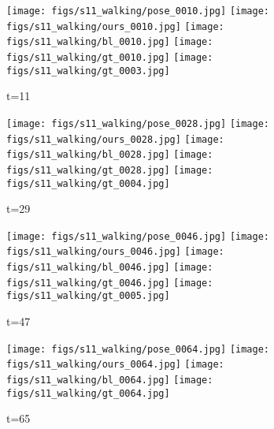 \documentclass{article}
\begin{document}
\begin{figure*}[thbp]
	\begin{subfigure}{0.04\linewidth}
        \raggedleft
    \end{subfigure}
    \begin{subfigure}{0.12\linewidth}
        \caption*{t=11}
        \vspace{-7pt}
	    \texttt{[image: figs/s11\_walking/pose\_0010.jpg]} 
  		\texttt{[image: figs/s11\_walking/ours\_0010.jpg]}
  		\texttt{[image: figs/s11\_walking/bl\_0010.jpg]}
  		\texttt{[image: figs/s11\_walking/gt\_0010.jpg]}
  		\texttt{[image: figs/s11\_walking/gt\_0003.jpg]}
	\end{subfigure} 
    \begin{subfigure}{0.12\linewidth}
        \caption*{t=29}
        \vspace{-7pt}
	    \texttt{[image: figs/s11\_walking/pose\_0028.jpg]} 
  		\texttt{[image: figs/s11\_walking/ours\_0028.jpg]}
  		\texttt{[image: figs/s11\_walking/bl\_0028.jpg]}
  		\texttt{[image: figs/s11\_walking/gt\_0028.jpg]}
  		\texttt{[image: figs/s11\_walking/gt\_0004.jpg]}
	\end{subfigure} 
    \begin{subfigure}{0.12\linewidth}
        \caption*{t=47}
        \vspace{-7pt}
	    \texttt{[image: figs/s11\_walking/pose\_0046.jpg]} 
  		\texttt{[image: figs/s11\_walking/ours\_0046.jpg]}
  		\texttt{[image: figs/s11\_walking/bl\_0046.jpg]}
  		\texttt{[image: figs/s11\_walking/gt\_0046.jpg]}
  		\texttt{[image: figs/s11\_walking/gt\_0005.jpg]}
	\end{subfigure} 
    \begin{subfigure}{0.12\linewidth}
        \caption*{t=65}
        \vspace{-7pt}
	    \texttt{[image: figs/s11\_walking/pose\_0064.jpg]} 
  		\texttt{[image: figs/s11\_walking/ours\_0064.jpg]}
  		\texttt{[image: figs/s11\_walking/bl\_0064.jpg]}
  		\texttt{[image: figs/s11\_walking/gt\_0064.jpg]}

\end{subfigure}
\end{figure*}
\end{document}
